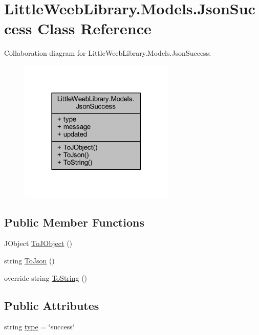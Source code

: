 \hypertarget{class_little_weeb_library_1_1_models_1_1_json_success}{}\section{Little\+Weeb\+Library.\+Models.\+Json\+Success Class Reference}
\label{class_little_weeb_library_1_1_models_1_1_json_success}


Collaboration diagram for Little\+Weeb\+Library.\+Models.\+Json\+Success\+:\nopagebreak
\begin{figure}[H]
\begin{center}
\leavevmode
\includegraphics[width=210pt]{class_little_weeb_library_1_1_models_1_1_json_success__coll__graph}
\end{center}
\end{figure}
\subsection*{Public Member Functions}
\begin{DoxyCompactItemize}
\item 
J\+Object \mbox{\hyperlink{class_little_weeb_library_1_1_models_1_1_json_success_aa0e750a34606497266e5a4aedc03cdeb}{To\+J\+Object}} ()
\item 
string \mbox{\hyperlink{class_little_weeb_library_1_1_models_1_1_json_success_a407103dc37a77aaf47a782296bab7518}{To\+Json}} ()
\item 
override string \mbox{\hyperlink{class_little_weeb_library_1_1_models_1_1_json_success_abd0bbcc176b7accbefc425a70816b12a}{To\+String}} ()
\end{DoxyCompactItemize}
\subsection*{Public Attributes}
\begin{DoxyCompactItemize}
\item 
string \mbox{\hyperlink{class_little_weeb_library_1_1_models_1_1_json_success_a6c518d7f5a6e5b08760bda2ea952a0ad}{type}} = \char`\"{}success\char`\"{}
\end{DoxyCompactItemize}
